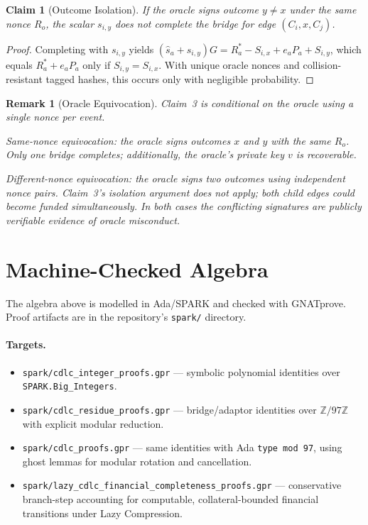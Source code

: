\documentclass[11pt,a4paper]{article}
\newcommand{\code}[1]{\texttt{#1}}
\theoremstyle{claimstyle}
\newtheorem{claim}{Claim}[section]
\newtheorem{remark}{Remark}[section]
\begin{document}
\begin{claim}[Outcome Isolation]
If the oracle signs outcome $y \neq x$ under the same nonce $R_o$, the scalar
$s_{i,y}$ does not complete the bridge for edge $(C_i, x, C_j)$.
\end{claim}
\begin{proof}
Completing with $s_{i,y}$ yields $(\hat{s}_a + s_{i,y})G = R^*_a - S_{i,x} +
e_a P_a + S_{i,y}$, which equals $R^*_a + e_a P_a$ only if $S_{i,y} = S_{i,x}$.
With unique oracle nonces and collision-resistant tagged hashes, this occurs
only with negligible probability.
\end{proof}

\begin{remark}[Oracle Equivocation]
Claim~3 is conditional on the oracle using a single nonce per event.

\emph{Same-nonce equivocation}: the oracle signs outcomes $x$ and $y$ with the
same $R_o$. Only one bridge completes; additionally, the oracle's private key
$v$ is recoverable.

\emph{Different-nonce equivocation}: the oracle signs two outcomes using
independent nonce pairs. Claim~3's isolation argument does not apply; both child
edges could become funded simultaneously. In both cases the conflicting
signatures are publicly verifiable evidence of oracle misconduct.
\end{remark}

\section{Machine-Checked Algebra}

The algebra above is modelled in Ada/SPARK and checked with GNATprove. Proof
artifacts are in the repository's \texttt{spark/} directory.

\paragraph{Targets.}
\begin{itemize}[noitemsep]
  \item \code{spark/cdlc\_integer\_proofs.gpr} --- symbolic polynomial
    identities over \code{SPARK.Big\_Integers}.
  \item \code{spark/cdlc\_residue\_proofs.gpr} --- bridge/adaptor identities
    over $\mathbb{Z}/97\mathbb{Z}$ with explicit modular reduction.
  \item \code{spark/cdlc\_proofs.gpr} --- same identities with Ada \code{type
    mod 97}, using ghost lemmas for modular rotation and cancellation.
  \item \code{spark/lazy\_cdlc\_financial\_completeness\_proofs.gpr} ---
    conservative branch-step accounting for computable, collateral-bounded
    financial transitions under Lazy Compression.
\end{itemize}
\end{document}
